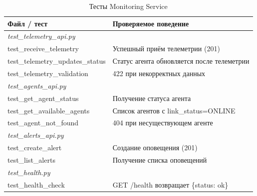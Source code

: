 \documentclass[12pt,a4paper]{article}
\begin{document}
\begin{table}[H]
\centering
\caption{Тесты Monitoring Service}
\begin{tabularx}{\textwidth}{|l|X|}
\hline
\textbf{Файл / тест} & \textbf{Проверяемое поведение} \\
\hline
\multicolumn{2}{|l|}{\textit{test\_telemetry\_api.py}} \\
\hline
test\_receive\_telemetry    & Успешный приём телеметрии (201) \\
test\_telemetry\_updates\_status & Статус агента обновляется после телеметрии \\
test\_telemetry\_validation & 422 при некорректных данных \\
\hline
\multicolumn{2}{|l|}{\textit{test\_agents\_api.py}} \\
\hline
test\_get\_agent\_status    & Получение статуса агента \\
test\_get\_available\_agents & Список агентов с link\_status=ONLINE \\
test\_agent\_not\_found     & 404 при несуществующем агенте \\
\hline
\multicolumn{2}{|l|}{\textit{test\_alerts\_api.py}} \\
\hline
test\_create\_alert         & Создание оповещения (201) \\
test\_list\_alerts          & Получение списка оповещений \\
\hline
\multicolumn{2}{|l|}{\textit{test\_health.py}} \\
\hline
test\_health\_check         & GET /health возвращает \{status: ok\} \\
\hline
\end{tabularx}
\end{table}
\end{document}
